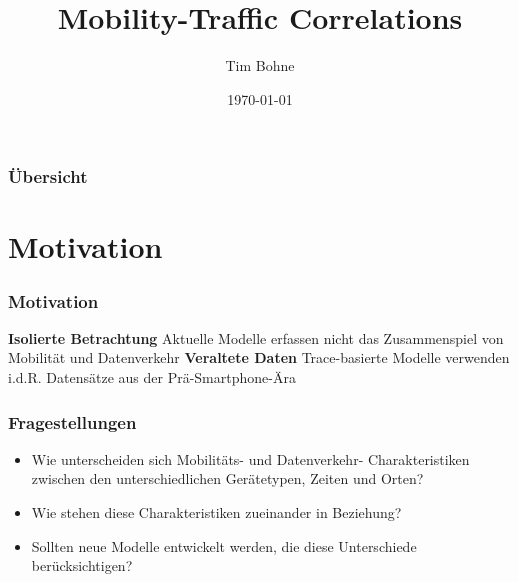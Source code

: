 \documentclass{beamer}
\title[]{Mobility-Traffic Correlations}
\author{Tim Bohne}
\institute[]
{
\textit{Bachelor-Seminar: Mobility and Traffic in Computer Networks}
\medskip
}
\date{\today}
\begin{document}
\begin{frame}[plain] %
\titlepage %
\end{frame}

\begin{frame}
\frametitle{Übersicht} %
\tableofcontents
\end{frame}

\section{Motivation}

\begin{frame}
\frametitle{Motivation}
\textit{}
\newline\newline\newline
\textbf{Isolierte Betrachtung}\newline
Aktuelle Modelle erfassen nicht das Zusammenspiel von Mobilität und Datenverkehr\newline\newline
\textbf{Veraltete Daten}\newline
Trace-basierte Modelle verwenden i.d.R. Datensätze aus der Prä-Smartphone-Ära
\begin{figure}
\centering
\end{figure}
\end{frame}

\begin{frame}
  \frametitle{Fragestellungen}
  \begin{itemize}
    \item Wie unterscheiden sich Mobilitäts- und Datenverkehr- Charakteristiken zwischen den unterschiedlichen Gerätetypen,
    Zeiten und Orten?\newline
    \item Wie stehen diese Charakteristiken zueinander in Beziehung?\newline
    \item Sollten neue Modelle entwickelt werden, die diese Unterschiede berücksichtigen?
\end{itemize}
\end{frame}
\end{document}
